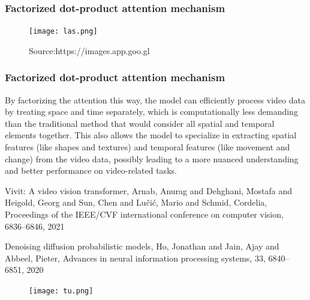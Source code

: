 \documentclass[11pt]{beamer}
\begin{document}
\begin{frame}
	\frametitle{Factorized dot-product attention mechanism}
	
	
\begin{figure}
	\centering
	\texttt{[image: las.png]} 
	\caption{Source:https://images.app.goo.gl}
	\label{fig: Source: https://images.app.goo.gl/} %
\end{figure}
\end{frame}

\begin{frame}
	\frametitle{Factorized dot-product attention mechanism}
	By factorizing the attention this way, the model can efficiently process video data by treating space and time separately, which is computationally less demanding than the traditional method that would consider all spatial and temporal elements together. This also allows the model to specialize in extracting spatial features (like shapes and textures) and temporal features (like movement and change) from the video data, possibly leading to a more nuanced understanding and better performance on video-related tasks.
\end{frame}

\begin{frame}

	\begin{thebibliography}{100}
	
	\bibitem{} 
	Vivit: A video vision transformer,
		Arnab, Anurag and Dehghani, Mostafa and Heigold, Georg and Sun, Chen and Lu{\v{c}}i{\'c}, Mario and Schmid, Cordelia,
	Proceedings of the IEEE/CVF international conference on computer vision,
		6836--6846,
		2021

	   
	\bibitem{}  Denoising diffusion probabilistic models,
	   	Ho, Jonathan and Jain, Ajay and Abbeel, Pieter,
	   Advances in neural information processing systems,
	   33,
	   	6840--6851,
	   	2020
	 
\end{thebibliography} 
\end{frame}

\begin{frame}
	\begin{figure}
		\centering
		\texttt{[image: tu.png]} 
	\end{figure}

\end{frame}
\end{document}
